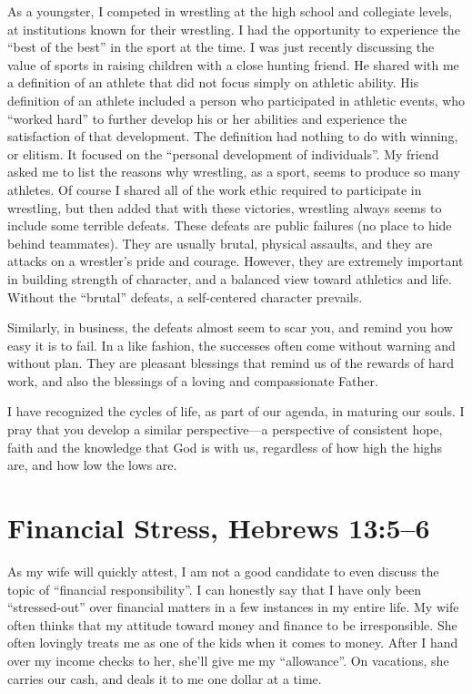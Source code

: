 \documentclass[12pt]{memoir}
\begin{document}
As a youngster, I competed in wrestling at the high school and collegiate
levels, at institutions known for their wrestling. I had the opportunity
to experience the ``best of the best'' in the sport at the time.
I was just recently discussing the value of sports in raising children
with a close hunting friend. He shared with me a definition of an
athlete that did not focus simply on athletic ability. His definition
of an athlete included a person who participated in athletic events,
who ``worked hard'' to further develop his or her abilities and
experience the satisfaction of that development. The definition had
nothing to do with winning, or elitism. It focused on the ``personal
development of individuals''. My friend asked me to list the reasons
why wrestling, as a sport, seems to produce so many athletes. Of course
I shared all of the work ethic required to participate in wrestling,
but then added that with these victories, wrestling always seems to
include some terrible defeats. These defeats are public failures (no
place to hide behind teammates). They are usually brutal, physical
assaults, and they are attacks on a wrestler's pride and courage.
However, they are extremely important in building strength of character,
and a balanced view toward athletics and life. Without the ``brutal''
defeats, a self-centered character prevails.

Similarly, in business, the defeats almost seem to scar you, and remind
you how easy it is to fail. In a like fashion, the successes often
come without warning and without plan. They are pleasant blessings
that remind us of the rewards of hard work, and also the blessings
of a loving and compassionate Father.

I have recognized the cycles of life, as part of our agenda, in maturing
our souls. I pray that you develop a similar perspective---a perspective
of consistent hope, faith and the knowledge that God is with us, regardless
of how high the highs are, and how low the lows are. 

\section{Financial Stress, Hebrews 13:5--6}

As my wife will quickly attest, I am not a good candidate to even
discuss the topic of ``financial responsibility''. I can honestly
say that I have only been ``stressed-out'' over financial matters
in a few instances in my entire life. My wife often thinks that my
attitude toward money and finance to be irresponsible. She often lovingly
treats me as one of the kids when it comes to money. After I hand
over my income checks to her, she'll give me my ``allowance''. On
vacations, she carries our cash, and deals it to me one dollar at
a time. 
\end{document}
